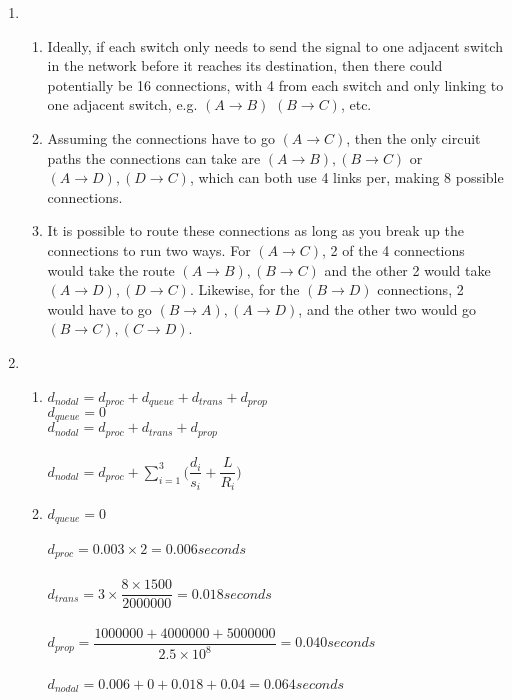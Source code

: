 \documentclass[12pt]{article}
\begin{document}
\begin{enumerate}
	\item \begin{enumerate}
			\item Ideally, if each switch only needs to send the signal to one adjacent switch in the network before it reaches its destination, then there could potentially be 16 connections, with 4 from each switch and only linking to one adjacent switch, e.g. $(A \rightarrow B)$ $(B \rightarrow C)$, etc.
			\item Assuming the connections have to go $(A \rightarrow C)$, then the only circuit paths the connections can take are $(A \rightarrow B), (B \rightarrow C)$ or $(A \rightarrow D), (D \rightarrow C)$, which can both use 4 links per, making 8 possible connections.
			\item It is possible to route these connections as long as you break up the connections to run two ways. For $(A \rightarrow C)$, 2 of the 4 connections would take the route $(A \rightarrow B), (B \rightarrow C)$ and the other 2 would take $(A \rightarrow D), (D \rightarrow C)$. Likewise, for the $(B \rightarrow D)$ connections, 2 would have to go $(B \rightarrow A), (A \rightarrow D)$, and the other two would go $(B \rightarrow C), (C \rightarrow D)$.
		\end{enumerate}
	\item \begin{enumerate}
			\item 
			$d_{nodal} = d_{proc} + d_{queue} + d_{trans} + d_{prop}$\\
				$d_{queue} = 0$\\
				$d_{nodal} = d_{proc} + d_{trans} + d_{prop}$\\
				\\
				$d_{nodal} = d_{proc} + \sum\limits_{i=1}^{3} \big(\dfrac{ d_{i} }{ s_{i} } + \dfrac{L}{R_{i}} \big)$
			\item $d_{queue} = 0$\\
				\\
				$d_{proc} = 0.003 \times 2 = 0.006 seconds$\\
				\\
				$d_{trans} = 3\times \dfrac{8 \times 1500}{2000000} = 0.018 seconds $\\
				\\
				$d_{prop} = \dfrac{1000000 + 4000000 + 5000000}{2.5\times 10^{8}} = 0.040seconds $\\
				\\
				$d_{nodal} = 0.006 + 0 + 0.018 + 0.04 = 0.064 seconds$
		\end{enumerate}


\end{enumerate}
\end{document}
